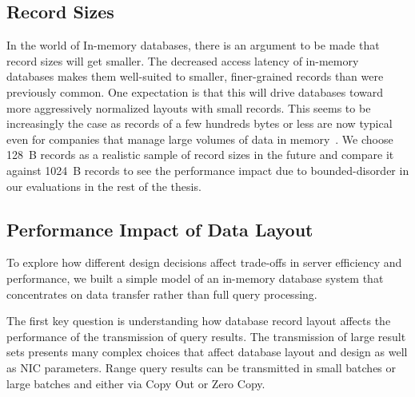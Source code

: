 \subsection{Record Sizes}
In the world of In-memory databases, there is an argument to be made that record sizes will get smaller.
The decreased access latency of in-memory databases makes them well-suited to smaller, finer-grained records
than were previously common. One expectation is that this will drive databases
toward more aggressively normalized layouts with small records. This
seems to be increasingly the case as records of a few hundreds bytes or less
are now typical even for companies that manage large volumes of data in memory~\cite{fb-memcache,fb-workload,inmemoryworkload}. 
We choose 128~B records as a realistic sample of record sizes in the future and compare it against 
1024~B records to see the performance impact due to bounded-disorder in our evaluations in the rest of the thesis.



\subsection{Performance Impact of Data Layout}
\label{sec:zero-copy-tput}

%
To explore how different design decisions affect trade-offs in server efficiency and
performance, we built a simple model of an in-memory database system that
concentrates on data transfer rather than full query processing.

The first key question is understanding how database record layout affects the
performance of the transmission of query results.  The transmission of large
result sets presents many complex choices that affect
database layout and design as well as NIC parameters.  Range query
results can be transmitted in small batches or large batches and either via
Copy Out or Zero Copy.

